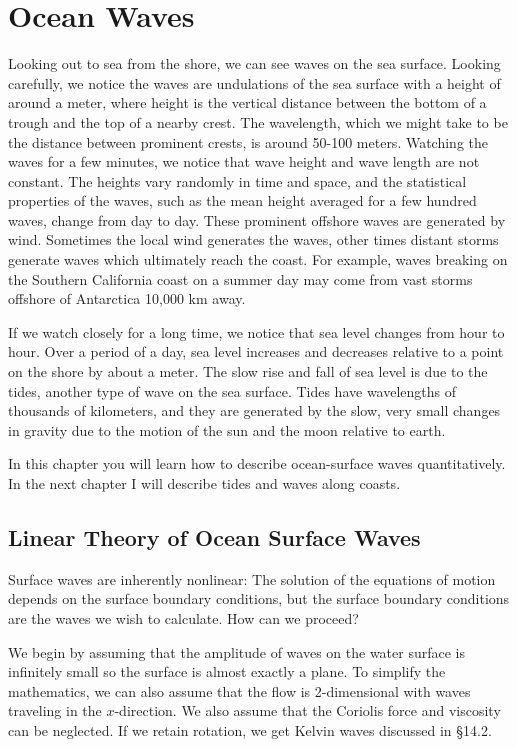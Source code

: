 \chapter{Ocean Waves} 
Looking out to sea from the shore, we can see waves on the sea
surface.  Looking carefully, we notice the waves are undulations of
the sea surface with a height of around a meter, where height is the
vertical distance between the bottom of a trough and the top of a
nearby crest. The wavelength, which we might take to be the distance
between prominent crests, is around 50-100 meters.  Watching the waves
for a few minutes, we notice that wave height and wave length are not
constant. The heights vary randomly in time and space, and the
statistical properties of the waves, such as the mean height averaged
for a few hundred waves, change from day to day. These prominent
offshore waves are generated by wind. Sometimes the local wind
generates the waves, other times distant storms generate waves which
ultimately reach the coast. For example, waves breaking on the
Southern California coast on a summer day may come from vast storms
offshore of Antarctica 10,000 km away.

If we watch closely for a long time, we notice that sea level changes
from hour to hour. Over a period of a day, sea level increases and
decreases relative to a point on the shore by about a meter. The slow
rise and fall of sea level is due to the tides, another type of wave
on the sea surface. Tides have wavelengths of thousands
of kilometers, and they are generated by the slow, very small changes
in gravity due to the motion of the sun and the
moon relative to earth.

In this chapter you will learn how to describe ocean-surface waves
quantitatively. In the next chapter I will describe tides and waves
along coasts.

\section{Linear Theory of Ocean Surface Waves}
Surface waves are inherently nonlinear: The
solution of the equations of motion depends on the surface boundary
conditions, but the surface boundary conditions are the waves we wish
to calculate. How can we proceed?

We begin by assuming that the amplitude of waves on the water surface
is infinitely small so the surface is almost exactly a plane. To
simplify the mathematics, we can also assume that the flow is
2-dimensional with waves traveling in the $x$-direction. We also
assume that the Coriolis force and viscosity can be neglected. If we
retain rotation, we get Kelvin waves discussed in
\S 14.2.

